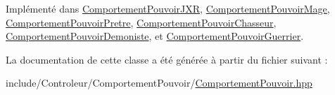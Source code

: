 Implémenté dans \hyperlink{class_comportement_pouvoir_j_x_r_a3d40cb49543bd69accaa1ddfb09aa9cc}{Comportement\-Pouvoir\-J\-X\-R}, \hyperlink{class_comportement_pouvoir_mage_a8a85b640972603a96f87222306e57e7d}{Comportement\-Pouvoir\-Mage}, \hyperlink{class_comportement_pouvoir_pretre_a24e87d9b2cb5ab4116d67ace5d3c9687}{Comportement\-Pouvoir\-Pretre}, \hyperlink{class_comportement_pouvoir_chasseur_a334058c088f33d706f636cadd97150da}{Comportement\-Pouvoir\-Chasseur}, \hyperlink{class_comportement_pouvoir_demoniste_a85abc906021128b61ba1c292921c411d}{Comportement\-Pouvoir\-Demoniste}, et \hyperlink{class_comportement_pouvoir_guerrier_a2747bbff54360379e100aa62254a2a79}{Comportement\-Pouvoir\-Guerrier}.



La documentation de cette classe a été générée à partir du fichier suivant \-:\begin{DoxyCompactItemize}
\item 
include/\-Controleur/\-Comportement\-Pouvoir/\hyperlink{_comportement_pouvoir_8hpp}{Comportement\-Pouvoir.\-hpp}\end{DoxyCompactItemize}
